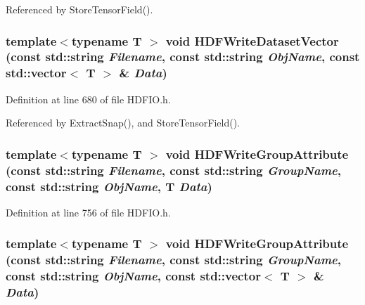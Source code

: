 Referenced by StoreTensorField().

\subsubsection[{HDFWriteDatasetVector}]{\setlength{\rightskip}{0pt plus 5cm}template$<$typename T $>$ void HDFWriteDatasetVector (const std::string {\em Filename}, \/  const std::string {\em ObjName}, \/  const std::vector$<$ T $>$ \& {\em Data})}\label{HDFIO_8h_a2beb19611043d3393a282ae7a2810075}


Definition at line 680 of file HDFIO.h.



Referenced by ExtractSnap(), and StoreTensorField().

\subsubsection[{HDFWriteGroupAttribute}]{\setlength{\rightskip}{0pt plus 5cm}template$<$typename T $>$ void HDFWriteGroupAttribute (const std::string {\em Filename}, \/  const std::string {\em GroupName}, \/  const std::string {\em ObjName}, \/  T {\em Data})}\label{HDFIO_8h_a63d06b2c68f083f2a15b63f95b228a9b}


Definition at line 756 of file HDFIO.h.

\subsubsection[{HDFWriteGroupAttribute}]{\setlength{\rightskip}{0pt plus 5cm}template$<$typename T $>$ void HDFWriteGroupAttribute (const std::string {\em Filename}, \/  const std::string {\em GroupName}, \/  const std::string {\em ObjName}, \/  const std::vector$<$ T $>$ \& {\em Data})}\label{HDFIO_8h_a93cc34de059a978c3b65e4a2fdd8bbc8}


